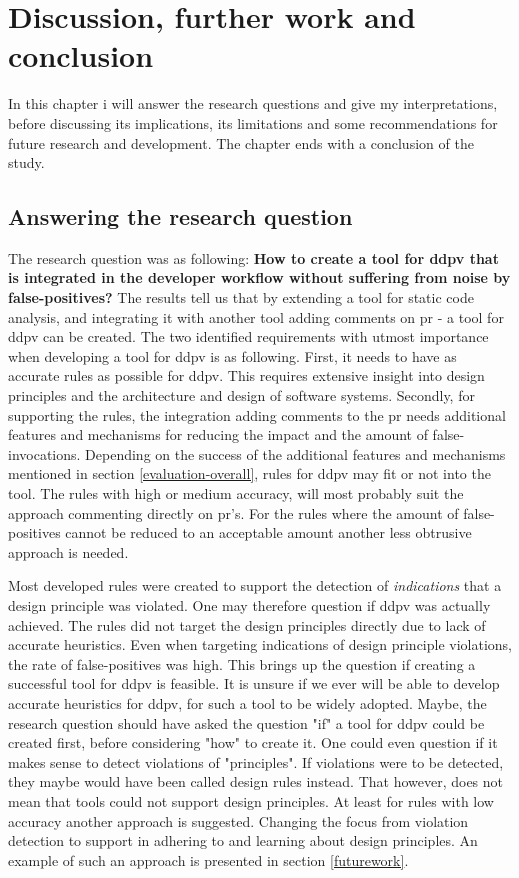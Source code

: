 \documentclass{report}
\begin{document}
\chapter{Discussion, further work and conclusion}
\label{discussion}
In this chapter i will answer the research questions and give my interpretations, before discussing its implications, its limitations and some recommendations for future research and development. The chapter ends with a conclusion of the study.

\section{Answering the research question}

The research question was as following: \textbf{How to create a tool for \gls{ddpv} that is integrated in the developer workflow without suffering from noise by false-positives?}
The results tell us that by extending a tool for static code analysis, and integrating it with another tool adding comments on \gls{pr} - a tool for \gls{ddpv} can be created. The two identified requirements with utmost importance when developing a tool for \gls{ddpv} is as following. First, it needs to have as accurate rules as possible for \gls{ddpv}. This requires extensive insight into design principles and the architecture and design of software systems. Secondly, for supporting the rules, the integration adding comments to the \gls{pr} needs additional features and mechanisms for reducing the impact and the amount of false-invocations. Depending on the success of the additional features and mechanisms mentioned in section \ref{evaluation-overall}, rules for \gls{ddpv} may fit or not into the tool. The rules with high or medium accuracy, will most probably suit the approach commenting directly on \gls{pr}'s. For the rules where the amount of false-positives cannot be reduced to an acceptable amount another less obtrusive approach is needed. 


Most developed rules were created to support the detection of \textit{indications} that a design principle was violated. One may therefore question if \gls{ddpv} was actually achieved. The rules did not target the design principles directly due to lack of accurate heuristics. Even when targeting indications of design principle violations, the rate of false-positives was high. This brings up the question if creating a successful tool for \gls{ddpv} is feasible. It is unsure if we ever will be able to develop accurate heuristics for \gls{ddpv}, for such a tool to be widely adopted. Maybe, the research question should have asked the question "if" a tool for \gls{ddpv} could be created first, before considering "how" to create it. One could even question if it makes sense to detect violations of "principles". If violations were to be detected, they maybe would have been called design rules instead. That however, does not mean that tools could not support design principles. At least for rules with low accuracy another approach is suggested. Changing the focus from violation detection to support in adhering to and learning about design principles. An example of such an approach is presented in section \ref{futurework}.
\end{document}

